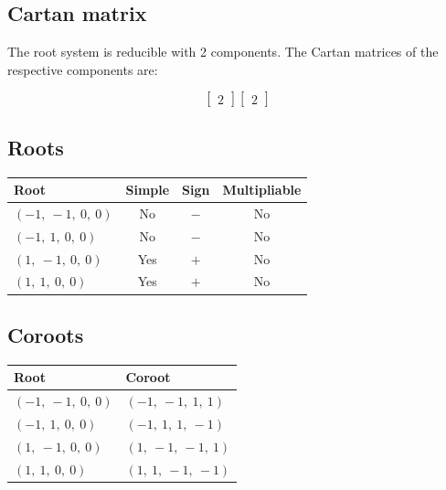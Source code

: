 \documentclass[11pt]{article}
\theoremstyle{definition}
\newif\ifrootsystemirreducible
\begin{document}
\subsection{Cartan matrix}

\ifrootsystemirreducible
The root system is irreducible and has Cartan matrix:
\else
The root system is reducible with 2 components. The Cartan matrices of the respective components are:
\fi

\[
 \left[\begin{matrix}2\end{matrix}\right] \left[\begin{matrix}2\end{matrix}\right]
\]

\subsection{Roots}

\begin{tabular}{|l|c|c|c|}
    \hline
    \textbf{Root} & \textbf{Simple} & \textbf{Sign} & \textbf{Multipliable} \\
    \hline
    $\left( -1, \  -1, \  0, \  0\right)$ & No & $-$ & No \\
    \hline
    $\left( -1, \  1, \  0, \  0\right)$ & No & $-$ & No \\
    \hline
    $\left( 1, \  -1, \  0, \  0\right)$ & Yes & $+$ & No \\
    \hline
    $\left( 1, \  1, \  0, \  0\right)$ & Yes & $+$ & No \\
    \hline
\end{tabular}


\subsection{Coroots}

\begin{tabular}{|l|l|}
    \hline
    \textbf{Root} & \textbf{Coroot} \\
    \hline
    $\left( -1, \  -1, \  0, \  0\right)$ & $\left( -1, \  -1, \  1, \  1\right)$ \\
    \hline
    $\left( -1, \  1, \  0, \  0\right)$ & $\left( -1, \  1, \  1, \  -1\right)$ \\
    \hline
    $\left( 1, \  -1, \  0, \  0\right)$ & $\left( 1, \  -1, \  -1, \  1\right)$ \\
    \hline
    $\left( 1, \  1, \  0, \  0\right)$ & $\left( 1, \  1, \  -1, \  -1\right)$ \\
    \hline
\end{tabular}
\end{document}
